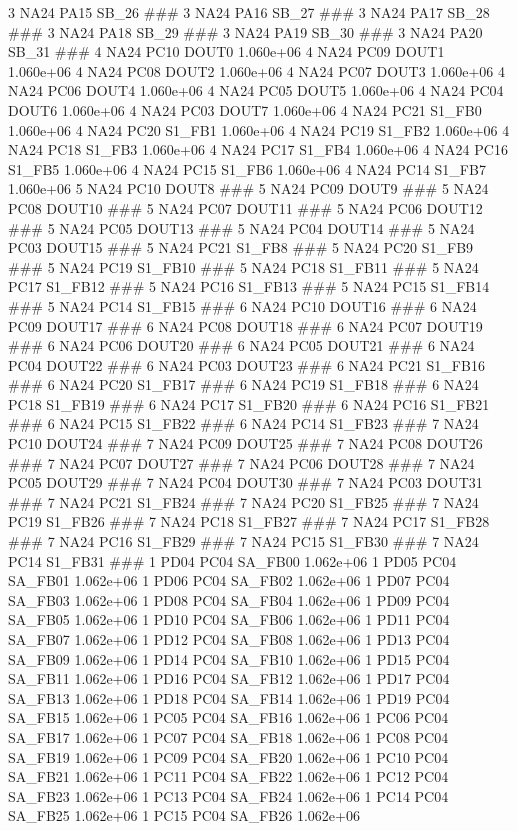 3 NA24 PA15 SB_26 ### 
3 NA24 PA16 SB_27 ### 
3 NA24 PA17 SB_28 ### 
3 NA24 PA18 SB_29 ### 
3 NA24 PA19 SB_30 ### 
3 NA24 PA20 SB_31 ### 
4 NA24 PC10 DOUT0 1.060e+06 
4 NA24 PC09 DOUT1 1.060e+06 
4 NA24 PC08 DOUT2 1.060e+06 
4 NA24 PC07 DOUT3 1.060e+06 
4 NA24 PC06 DOUT4 1.060e+06 
4 NA24 PC05 DOUT5 1.060e+06 
4 NA24 PC04 DOUT6 1.060e+06 
4 NA24 PC03 DOUT7 1.060e+06 
4 NA24 PC21 S1_FB0 1.060e+06 
4 NA24 PC20 S1_FB1 1.060e+06 
4 NA24 PC19 S1_FB2 1.060e+06 
4 NA24 PC18 S1_FB3 1.060e+06 
4 NA24 PC17 S1_FB4 1.060e+06 
4 NA24 PC16 S1_FB5 1.060e+06 
4 NA24 PC15 S1_FB6 1.060e+06 
4 NA24 PC14 S1_FB7 1.060e+06 
5 NA24 PC10 DOUT8 ### 
5 NA24 PC09 DOUT9 ### 
5 NA24 PC08 DOUT10 ### 
5 NA24 PC07 DOUT11 ### 
5 NA24 PC06 DOUT12 ### 
5 NA24 PC05 DOUT13 ### 
5 NA24 PC04 DOUT14 ### 
5 NA24 PC03 DOUT15 ### 
5 NA24 PC21 S1_FB8 ### 
5 NA24 PC20 S1_FB9 ### 
5 NA24 PC19 S1_FB10 ### 
5 NA24 PC18 S1_FB11 ### 
5 NA24 PC17 S1_FB12 ### 
5 NA24 PC16 S1_FB13 ### 
5 NA24 PC15 S1_FB14 ### 
5 NA24 PC14 S1_FB15 ### 
6 NA24 PC10 DOUT16 ### 
6 NA24 PC09 DOUT17 ### 
6 NA24 PC08 DOUT18 ### 
6 NA24 PC07 DOUT19 ### 
6 NA24 PC06 DOUT20 ### 
6 NA24 PC05 DOUT21 ### 
6 NA24 PC04 DOUT22 ### 
6 NA24 PC03 DOUT23 ### 
6 NA24 PC21 S1_FB16 ### 
6 NA24 PC20 S1_FB17 ### 
6 NA24 PC19 S1_FB18 ### 
6 NA24 PC18 S1_FB19 ### 
6 NA24 PC17 S1_FB20 ### 
6 NA24 PC16 S1_FB21 ### 
6 NA24 PC15 S1_FB22 ### 
6 NA24 PC14 S1_FB23 ### 
7 NA24 PC10 DOUT24 ### 
7 NA24 PC09 DOUT25 ### 
7 NA24 PC08 DOUT26 ### 
7 NA24 PC07 DOUT27 ### 
7 NA24 PC06 DOUT28 ### 
7 NA24 PC05 DOUT29 ### 
7 NA24 PC04 DOUT30 ### 
7 NA24 PC03 DOUT31 ### 
7 NA24 PC21 S1_FB24 ### 
7 NA24 PC20 S1_FB25 ### 
7 NA24 PC19 S1_FB26 ### 
7 NA24 PC18 S1_FB27 ### 
7 NA24 PC17 S1_FB28 ### 
7 NA24 PC16 S1_FB29 ### 
7 NA24 PC15 S1_FB30 ### 
7 NA24 PC14 S1_FB31 ### 
1 PD04 PC04 SA_FB00 1.062e+06 
1 PD05 PC04 SA_FB01 1.062e+06 
1 PD06 PC04 SA_FB02 1.062e+06 
1 PD07 PC04 SA_FB03 1.062e+06 
1 PD08 PC04 SA_FB04 1.062e+06 
1 PD09 PC04 SA_FB05 1.062e+06 
1 PD10 PC04 SA_FB06 1.062e+06 
1 PD11 PC04 SA_FB07 1.062e+06 
1 PD12 PC04 SA_FB08 1.062e+06 
1 PD13 PC04 SA_FB09 1.062e+06 
1 PD14 PC04 SA_FB10 1.062e+06 
1 PD15 PC04 SA_FB11 1.062e+06 
1 PD16 PC04 SA_FB12 1.062e+06 
1 PD17 PC04 SA_FB13 1.062e+06 
1 PD18 PC04 SA_FB14 1.062e+06 
1 PD19 PC04 SA_FB15 1.062e+06 
1 PC05 PC04 SA_FB16 1.062e+06 
1 PC06 PC04 SA_FB17 1.062e+06 
1 PC07 PC04 SA_FB18 1.062e+06 
1 PC08 PC04 SA_FB19 1.062e+06 
1 PC09 PC04 SA_FB20 1.062e+06 
1 PC10 PC04 SA_FB21 1.062e+06 
1 PC11 PC04 SA_FB22 1.062e+06 
1 PC12 PC04 SA_FB23 1.062e+06 
1 PC13 PC04 SA_FB24 1.062e+06 
1 PC14 PC04 SA_FB25 1.062e+06 
1 PC15 PC04 SA_FB26 1.062e+06 
